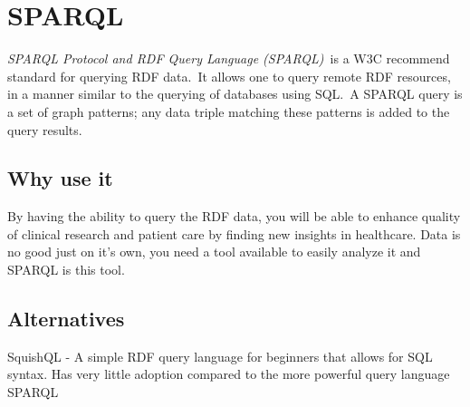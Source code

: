   \section[SPARQL Protocol and RDF Query Language (SPARQL)]{SPARQL}
  \label{sec:sparql}

  \textit{SPARQL Protocol and RDF Query Language (SPARQL)}\
  is a W3C recommend standard for querying RDF data.\
  It allows one to query remote RDF resources, in a manner similar to the querying of databases using SQL.\
  A SPARQL query is a set of graph patterns; any data triple matching these patterns is added to the query results. \citep{Jarrar_mashql:_2008}\

  \subsection{Why use it}

By having the ability to query the RDF data, you will be able to enhance quality of clinical research and patient care by finding new insights in healthcare. Data is no good just on it's own, you need a tool available to easily analyze it and SPARQL is this tool.
		
  \subsection{Alternatives}

  SquishQL - A simple RDF query language for beginners that allows for SQL syntax. Has very little adoption compared to the more powerful query language SPARQL  \citep{_Mikhalenko_2013}\\

